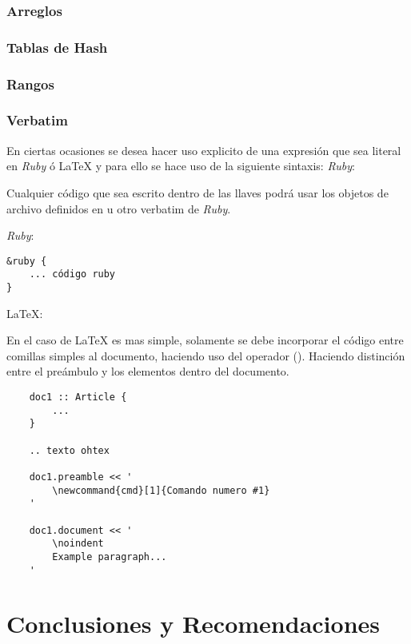 \documentclass[12pt,letterpaper,titlepage,oneside,openright]{book}
\newcommand{\OhTeX}{%
    \makebox[0.76em][c]{O}%
    \makebox[0.25em][c]{%
        \raisebox{0.14em}[0em][0em]{%
            \fontsize{0.5em}{0cm}%
                \selectfont H%
        }%
    }%
    \makebox[1.35em][c]{\TeX}%
}
\newcommand{\latex}{\LaTeX\xspace}
\newcommand{\ohtex}{\OhTeX\xspace}
\newcommand{\ruby}{\textit{Ruby}\xspace}
\newcommand{\ttcode}[1]{(\texttt{#1})}
\begin{document}
\subsection{Arreglos}

\subsection{Tablas de Hash}

\subsection{Rangos}

\subsection{Verbatim}

En ciertas ocasiones se desea hacer uso explicito de una expresión que sea
literal en \ruby ó \latex y para ello se hace uso de la siguiente sintaxis:
 \ruby:

Cualquier código que sea escrito dentro de las llaves podrá usar los objetos de
archivo definidos en \ohtex u otro verbatim de \ruby.

\ruby:

\begin{center}
\begin{lstlisting}
&ruby {
    ... código ruby
}
\end{lstlisting}
\end{center}

\LaTeX:

En el caso de \latex es mas simple, solamente se debe incorporar el código entre
comillas simples al documento, haciendo uso del operador \ttcode{\<\<}. Haciendo
distinción entre el preámbulo y los elementos dentro del documento.

\begin{center}
\begin{lstlisting}
    doc1 :: Article {
        ...
    }

    .. texto ohtex

    doc1.preamble << '
        \newcommand{cmd}[1]{Comando numero #1}
    '

    doc1.document << '
        \noindent
        Example paragraph...
    '
\end{lstlisting}
\end{center}


\chapter{Conclusiones y Recomendaciones}
\lipsum[1-2]
\end{document}
